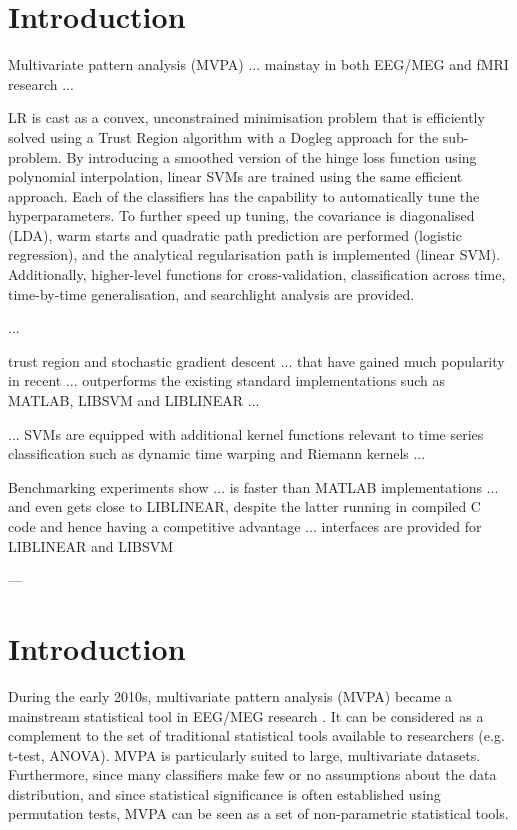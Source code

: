 \documentclass[utf8]{frontiersSCNS} %
\begin{document}
\section{Introduction}

Multivariate pattern analysis (MVPA) ... mainstay in both EEG/MEG and fMRI research ...


LR is cast as a convex, unconstrained minimisation problem that is efficiently solved using a Trust Region algorithm with a Dogleg approach for the sub-problem. By introducing a smoothed version of the hinge loss function using polynomial interpolation, linear SVMs are trained using the same efficient approach. Each of the classifiers has the capability to automatically tune the hyperparameters. To further speed up tuning, the covariance is diagonalised (LDA), warm starts and quadratic path prediction are performed (logistic regression), and the analytical regularisation path is implemented (linear SVM). Additionally, higher-level functions for cross-validation, classification across time, time-by-time generalisation, and searchlight analysis are provided.

...

trust region and stochastic gradient descent ... that have gained much popularity in recent ...
outperforms the existing standard implementations such as MATLAB, LIBSVM and LIBLINEAR ...

...
SVMs are equipped with additional kernel functions relevant to time series classification such as dynamic time warping and Riemann kernels ...


Benchmarking experiments show ... is faster than MATLAB implementations ... and even gets close to LIBLINEAR, despite the latter running in compiled C code and hence having a competitive advantage ...
interfaces are provided for LIBLINEAR and LIBSVM

---

\section{Introduction}

During the early 2010s, multivariate pattern analysis (MVPA) became a mainstream statistical tool in EEG/MEG research \citep{Blankertz2011,Grootswagers2017DecodingData}. It can be considered as a complement to the set of traditional statistical tools available to researchers (e.g. t-test, ANOVA). MVPA is particularly suited to large, multivariate datasets. Furthermore, since many classifiers make few or no assumptions about the data distribution, and since  statistical significance is often established using permutation tests, MVPA can be seen as a set of non-parametric statistical tools.
\end{document}
